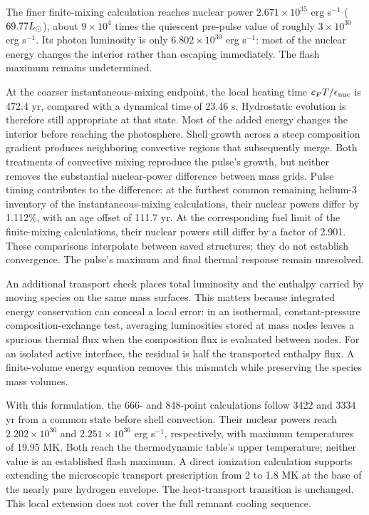 \documentclass[11pt,letterpaper]{article}
\begin{document}
The finer finite-mixing calculation reaches nuclear power
$2.671\times10^{35}$ erg s$^{-1}$ ($69.77L_\odot$), about $9\times10^4$ times
the quiescent pre-pulse value of roughly $3\times10^{30}$ erg s$^{-1}$.
Its photon luminosity is only $6.802\times10^{30}$ erg s$^{-1}$:
most of the nuclear energy changes the interior rather than escaping
immediately. The flash maximum remains undetermined.

At the coarser instantaneous-mixing endpoint, the local heating time
$c_P T/\epsilon_{\rm nuc}$ is 472.4 yr, compared with a dynamical time of
23.46 s. Hydrostatic evolution is therefore still appropriate at that state.
Most of the added energy changes the interior before reaching the photosphere.
Shell growth across a steep composition gradient produces neighboring
convective regions that subsequently merge. Both treatments of convective
mixing reproduce the pulse's growth, but neither removes the substantial
nuclear-power difference between mass grids. Pulse timing contributes to the
difference: at the furthest common remaining helium-3 inventory of the
instantaneous-mixing calculations, their nuclear powers differ by 1.112\%,
with an age offset of 111.7 yr. At the corresponding fuel limit of the
finite-mixing calculations, their nuclear powers still differ by a factor
of 2.901. These comparisons interpolate between saved structures; they do
not establish convergence. The pulse's maximum and final thermal response
remain unresolved.


An additional transport check places total luminosity and the enthalpy
carried by moving species on the same mass surfaces. This matters because
integrated energy conservation can conceal a local error: in an isothermal,
constant-pressure composition-exchange test, averaging luminosities stored
at mass nodes leaves a spurious thermal flux when the composition flux is
evaluated between nodes. For an isolated active interface, the residual is
half the transported enthalpy flux. A finite-volume energy equation removes
this mismatch while preserving the species mass volumes.

With this formulation, the 666- and 848-point calculations follow
3422 and 3334 yr from a common state before shell convection. Their
nuclear powers reach $2.202\times10^{36}$ and $2.251\times10^{36}$ erg s$^{-1}$,
respectively, with maximum temperatures of 19.95 MK. Both reach the
thermodynamic table's upper temperature; neither value is an established
flash maximum. A direct ionization calculation supports extending the
microscopic transport prescription from 2 to 1.8 MK at the base of the
nearly pure hydrogen envelope. The heat-transport transition is unchanged.
This local extension does not cover the full remnant cooling sequence.
\end{document}
